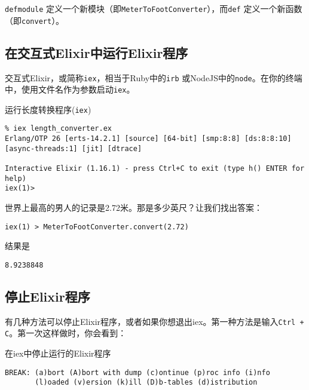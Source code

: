 \texttt{defmodule} 定义一个新模块（即\texttt{MeterToFootConverter}），而\texttt{def} 定义一个新函数（即\texttt{convert}）。

\subsection{在交互式Elixir中运行Elixir程序}

交互式Elixir，或简称\texttt{iex}，相当于Ruby中的\texttt{irb} 或NodeJS中的\texttt{node}。在你的终端中，使用文件名作为参数启动\texttt{iex}。

\begin{code}{运行长度转换程序(\texttt{iex})}
\centering
\begin{verbatim}
% iex length_converter.ex
Erlang/OTP 26 [erts-14.2.1] [source] [64-bit] [smp:8:8] [ds:8:8:10] [async-threads:1] [jit] [dtrace]

Interactive Elixir (1.16.1) - press Ctrl+C to exit (type h() ENTER for help)
iex(1)>
\end{verbatim}
\label{lst:2-2}
\end{code}

世界上最高的男人的记录是2.72米。那是多少英尺？让我们找出答案：

\begin{code}{}
\begin{verbatim}
iex(1) > MeterToFootConverter.convert(2.72)
\end{verbatim}
\end{code}

结果是

\begin{code}{}
\begin{verbatim}
8.9238848
\end{verbatim}
\end{code}

\subsection{停止Elixir程序}

有几种方法可以停止Elixir程序，或者如果你想退出iex。第一种方法是输入\texttt{Ctrl + C}。第一次这样做时，你会看到：

\begin{code}{在iex中停止运行的Elixir程序}
\begin{verbatim}
BREAK: (a)bort (A)bort with dump (c)ontinue (p)roc info (i)nfo
       (l)oaded (v)ersion (k)ill (D)b-tables (d)istribution
\end{verbatim}
\label{lst:stop_elixir_program}
\end{code}

